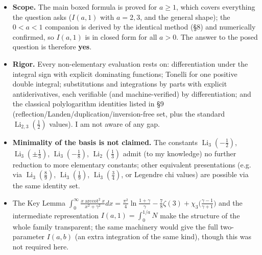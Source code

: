 \documentclass[11pt]{article}
\theoremstyle{remark}
\begin{document}
\begin{itemize}
\item \textbf{Scope.} The main boxed formula is proved for $a\ge1$, which covers everything the question asks ($I(a,1)$ with $a=2,3$, and the general shape); the $0<a<1$ companion is derived by the identical method (\S8) and numerically confirmed, so $I(a,1)$ is in closed form for all $a>0$. The answer to the posed question is therefore \textbf{yes}.
\item \textbf{Rigor.} Every non-elementary evaluation rests on: differentiation under the integral sign with explicit dominating functions; Tonelli for one positive double integral; substitutions and integrations by parts with explicit antiderivatives, each verifiable (and machine-verified) by differentiation; and the classical polylogarithm identities listed in \S9 (reflection/Landen/duplication/inversion-free set, plus the standard $\operatorname{Li}_{2,3}(\frac12)$ values). I am not aware of any gap.
\item \textbf{Minimality of the basis is not claimed.} The constants $\operatorname{Li}_3(-\frac12)$, $\operatorname{Li}_3(\pm\frac13)$, $\operatorname{Li}_3(-\frac18)$, $\operatorname{Li}_2(\frac13)$ admit (to my knowledge) no further reduction to more elementary constants; other equivalent presentations (e.g. via $\operatorname{Li}_3(\frac89)$, $\operatorname{Li}_3(\frac19)$, $\operatorname{Li}_3(\frac34)$, or Legendre chi values) are possible via the same identity set.
\item The Key Lemma $\int_0^\infty\frac{x\operatorname{arccot}^2x}{x^2+\gamma^2}dx=\frac{\pi^2}4\ln\frac{1+\gamma}{\gamma}-\frac78\zeta(3)+\chi_3\bigl(\frac{\gamma-1}{\gamma+1}\bigr)$ and the intermediate representation $I(a,1)=\int_0^{1/a}N$ make the structure of the whole family transparent; the same machinery would give the full two-parameter $I(a,b)$ (an extra integration of the same kind), though this was not required here.
\end{itemize}
\end{document}
